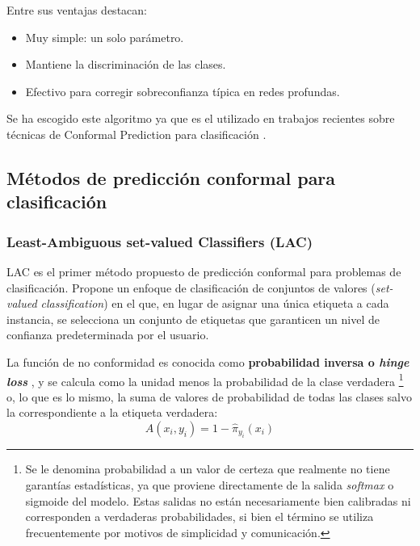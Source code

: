 Entre sus ventajas destacan:
\begin{itemize}
    \item Muy simple: un solo parámetro.
    \item Mantiene la discriminación de las clases.
    \item Efectivo para corregir sobreconfianza típica en redes profundas.
\end{itemize}

Se ha escogido este algoritmo ya que es el utilizado en trabajos recientes sobre técnicas de Conformal Prediction para clasificación \cite{angelopoulos2020, huang2023conformal}.


\subsection{Métodos de predicción conformal para clasificación}

\subsubsection{Least-Ambiguous set-valued Classifiers (LAC)}

LAC \cite{sadinle2019} es el primer método propuesto de predicción conformal para problemas de clasificación. Propone un enfoque de clasificación de conjuntos de valores (\textit{set-valued classification}) en el que, en lugar de asignar una única etiqueta a cada instancia, se selecciona un conjunto de etiquetas que garanticen un nivel de confianza predeterminada por el usuario.

La función de no conformidad es conocida como \textbf{probabilidad inversa o \textit{hinge loss}} \cite{johansson2017}, y se calcula como la unidad menos la probabilidad de la clase verdadera%
\footnote{
    Se le denomina probabilidad a un valor de certeza que realmente no tiene garantías estadísticas, ya que proviene directamente de la salida \textit{softmax} o sigmoide del modelo. Estas salidas no están necesariamente bien calibradas ni corresponden a verdaderas probabilidades, si bien el término se utiliza frecuentemente por motivos de simplicidad y comunicación.
}
o, lo que es lo mismo, la suma de valores de probabilidad de todas las clases salvo la correspondiente a la etiqueta verdadera:
$$
A(x_i,y_i) = 1- \hat{\pi}_{y_i}(x_i)
$$

